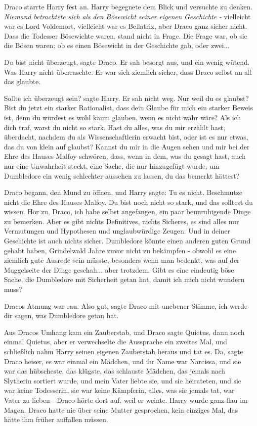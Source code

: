 Draco starrte Harry fest an. Harry begegnete dem Blick und versuchte zu denken.
\emph{Niemand betrachtete sich als den Bösewicht seiner eigenen Geschichte -}
vielleicht war es Lord Voldemort, vielleicht war es Bellatrix, aber Draco ganz
sicher nicht. Dass die Todesser Bösewichte waren, stand nicht in Frage. Die
Frage war, ob sie die Bösen waren; ob es einen Bösewicht in der Geschichte gab,
oder zwei...

\glqq Du bist nicht überzeugt\grqq{}, sagte Draco. Er sah besorgt aus, und ein
wenig wütend. Was Harry nicht überraschte. Er war sich ziemlich sicher, dass
Draco selbst an all das glaubte.

\glqq Sollte ich überzeugt sein?\grqq{} sagte Harry. Er sah nicht weg. \glqq Nur
weil du es glaubst? Bist du jetzt ein starker Rationalist, dass dein Glaube für
mich ein starker Beweis ist, denn du würdest es wohl kaum glauben, wenn es nicht
wahr wäre? Als ich dich traf, warst du nicht so stark. Hast du alles, was du mir
erzählt hast, überdacht, nachdem du als Wissenschaftlerin erwacht bist, oder ist
es nur etwas, das du von klein auf glaubst? Kannst du mir in die Augen sehen und
mir bei der Ehre des Hauses Malfoy schwören, dass, wenn in dem, was du gesagt
hast, auch nur eine Unwahrheit steckt, eine Sache, die nur hinzugefügt wurde, um
Dumbledore ein wenig schlechter aussehen zu lassen, du das bemerkt
hättest?\grqq{}

Draco begann, den Mund zu öffnen, und Harry sagte: \glqq Tu es nicht. Beschmutze
nicht die Ehre des Hauses Malfoy. Du bist noch nicht so stark, und das solltest
du wissen. Hör zu, Draco, ich habe selbst angefangen, ein paar beunruhigende
Dinge zu bemerken. Aber es gibt nichts Definitives, nichts Sicheres, es sind
alles nur Vermutungen und Hypothesen und unglaubwürdige Zeugen. Und in deiner
Geschichte ist auch nichts sicher. Dumbledore könnte einen anderen guten Grund
gehabt haben, Grindelwald Jahre zuvor nicht zu bekämpfen - obwohl es eine
ziemlich gute Ausrede sein müsste, besonders wenn man bedenkt, was auf der
Muggelseite der Dinge geschah... aber trotzdem. Gibt es eine eindeutig böse
Sache, die Dumbledore mit Sicherheit getan hat, damit ich mich nicht wundern
muss?\grqq{}

Dracos Atmung war rau. \glqq Also gut\grqq{}, sagte Draco mit unebener Stimme,
\glqq ich werde dir sagen, was Dumbledore getan hat.\grqq{}

Aus Dracos Umhang kam ein Zauberstab, und Draco sagte \glqq Quietus\grqq{}, dann
noch einmal \glqq Quietus\grqq{}, aber er verwechselte die Aussprache ein
zweites Mal, und schließlich nahm Harry seinen eigenen Zauberstab heraus und tat
es. \glqq Da\grqq{}, sagte Draco heiser, \glqq es war einmal ein Mädchen, und
ihr Name war Narcissa, und sie war das hübscheste, das klügste, das schlauste
Mädchen, das jemals nach Slytherin sortiert wurde, und mein Vater liebte sie,
und sie heirateten, und sie war keine Todesserin, sie war keine Kämpferin,
alles, was sie jemals tat, war Vater zu lieben -\grqq{} Draco hörte dort auf,
weil er weinte. Harry wurde ganz flau im Magen. Draco hatte nie über seine
Mutter gesprochen, kein einziges Mal, das hätte ihm früher auffallen müssen.

